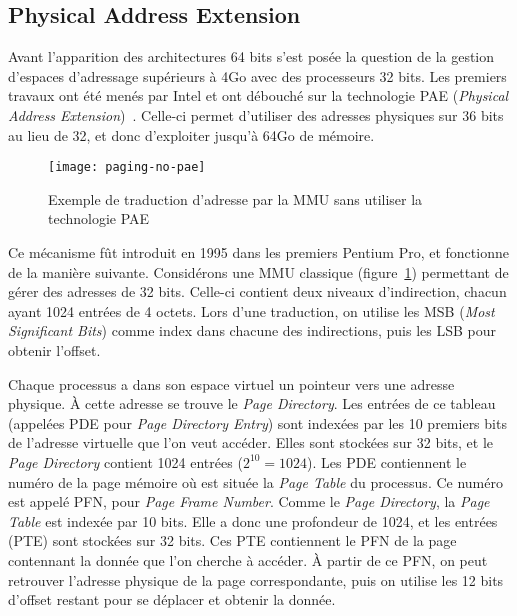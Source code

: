     \subsection{Physical Address Extension}

      Avant l'apparition des architectures 64 bits s'est posée la question de la
      gestion d'espaces d'adressage supérieurs à 4Go avec des processeurs 32
      bits. Les premiers travaux ont été menés par Intel et ont débouché sur la
      technologie PAE (\textit{Physical Address
        Extension})~\citep{patent6349380}. Celle-ci permet d'utiliser des
      adresses physiques sur 36 bits au lieu de 32, et donc d'exploiter jusqu'à
      64Go de mémoire.

      \begin{figure}[ht]
        \centering \texttt{[image: paging-no-pae]}
        \caption{Exemple de traduction d'adresse par la MMU sans utiliser la
          technologie PAE}
        \label{fig:paging-no-pae}
        \end{figure}
      
      Ce mécanisme fût introduit en 1995 dans les premiers Pentium Pro, et
      fonctionne de la manière suivante. Considérons une MMU classique
      (figure~\ref{fig:paging-no-pae}) permettant de gérer des adresses de 32
      bits. Celle-ci contient deux niveaux d'indirection, chacun ayant 1024
      entrées de 4 octets. Lors d'une traduction, on utilise les MSB
      (\textit{Most Significant Bits}) comme index dans chacune des
      indirections, puis les LSB pour obtenir l'offset.

      Chaque processus a dans son espace virtuel un pointeur vers une adresse
      physique. À cette adresse se trouve le \textit{Page Directory}. Les
      entrées de ce tableau (appelées PDE pour \textit{Page Directory Entry})
      sont indexées par les 10 premiers bits de l'adresse virtuelle que l'on
      veut accéder. Elles sont stockées sur 32 bits, et le \textit{Page
        Directory} contient 1024 entrées ($2^{10} = 1024$). Les PDE contiennent
      le numéro de la page mémoire où est située la \textit{Page Table} du
      processus. Ce numéro est appelé PFN, pour \textit{Page Frame
        Number}. Comme le \textit{Page Directory}, la \textit{Page Table} est
      indexée par 10 bits. Elle a donc une profondeur de 1024, et les entrées
      (PTE) sont stockées sur 32 bits. Ces PTE contiennent le PFN de la page
      contennant la donnée que l'on cherche à accéder. À partir de ce PFN, on
      peut retrouver l'adresse physique de la page correspondante, puis on
      utilise les 12 bits d'offset restant pour se déplacer et obtenir la
      donnée.

